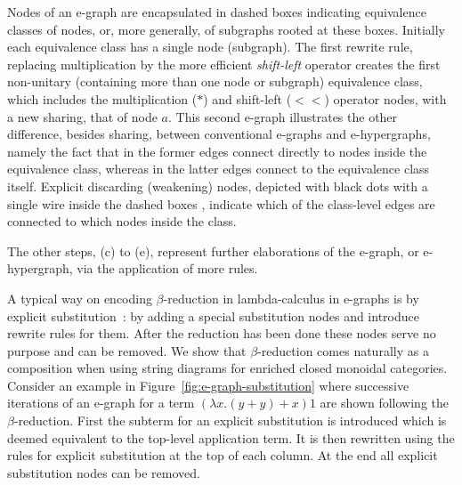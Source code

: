 \documentclass[peerreviewcls]{IEEEtran}
\begin{document}
Nodes of an e-graph are encapsulated in dashed boxes indicating equivalence classes of nodes, or, more generally, of subgraphs rooted at these boxes.
Initially each equivalence class has a single node (subgraph).
The first rewrite rule, replacing multiplication by the more efficient \emph{shift-left} operator creates the first non-unitary (containing more than one node or subgraph) equivalence class, which includes the multiplication ($*$) and shift-left ($<\!\!<$) operator nodes, with a new sharing, that of node $a$.
This second e-graph illustrates the other difference, besides sharing, between conventional e-graphs and e-hypergraphs, namely the fact that in the former edges connect directly to nodes inside the equivalence class, whereas in the latter edges connect to the equivalence class itself.
Explicit discarding (weakening) nodes, depicted with black dots with a single wire inside the dashed boxes 
, indicate which of the class-level edges are connected to which nodes inside the class.

The other steps, (c) to (e), represent further elaborations of the e-graph, or e-hypergraph, via the application of more rules.


A typical way on encoding $\beta$-reduction in lambda-calculus in e-graphs is by explicit substitution~\cite{EggPaper,koehler2022sketchguided}: by adding a special substitution nodes and introduce rewrite rules for them.
After the reduction has been done these nodes serve no purpose and can be removed.
We show that $\beta$-reduction comes naturally as a composition when using string diagrams for enriched closed monoidal categories.
Consider an example in Figure~\ref{fig:e-graph-substitution} where successive iterations of an e-graph for a term $(\lambda x . (y + y) + x) 1$ are shown following the $\beta$-reduction.
First the subterm for an explicit substitution is introduced which is deemed equivalent to the top-level application term.
It is then rewritten using the rules for explicit substitution at the top of each column.
At the end all explicit substitution nodes can be removed.
\end{document}
